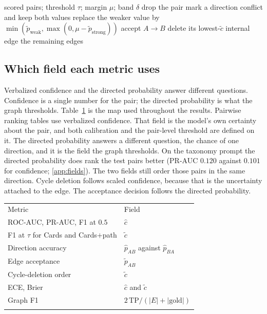 \documentclass{ws-ijait}
\newcommand{\phat}{\hat{p}}
\newcommand{\chat}{\hat{c}}
\begin{document}
\begin{algorithm}[t]
\caption{Reverse-conflict suppression and cycle breaking.}
\label{alg:c23}
\begin{algorithmic}[1]
\Require scored pairs; threshold $\tau$; margin $\mu$; band $\delta$
    \State drop the pair
    \State mark a direction conflict and keep both values
  \Else
    \State replace the weaker value by $\min(\tilde{p}_{\mathrm{weak}},\max(0,\mu-\tilde{p}_{\mathrm{strong}}))$
  \EndIf
    \State accept $A\to B$
  \EndIf
\EndFor
{}
  \State delete its lowest-$\tilde{c}$ internal edge
\EndWhile
\State \Return the remaining edges
\end{algorithmic}
\end{algorithm}

\subsection{Which field each metric uses}
\label{sec:fields}
Verbalized confidence and the directed probability answer different
questions.
Confidence is a single number for the pair; the directed probability
is what the graph thresholds.
Table~\ref{tab:fields} is the map used throughout the results.
Pairwise ranking tables use verbalized confidence.
That field is the model's own certainty about the pair, and both
calibration and the pair-level threshold are defined on it.
The directed probability answers a different question, the chance of
one direction, and it is the field the graph thresholds.
On the taxonomy prompt the directed probability does rank the test
pairs better ({PR}-{AUC} $0.120$ against $0.101$ for confidence;
\ref{app:fields}).
The two fields still order those pairs in the same direction.
Cycle deletion follows scaled confidence, because that is the
uncertainty attached to the edge.
The acceptance decision follows the directed probability.

\begin{table}[th]
{\begin{tabular}{@{}ll@{}}
\toprule
Metric & Field \\
\colrule
{ROC}-{AUC}, {PR}-{AUC}, {F1} at $0.5$ & $\chat$ \\
{F1} at $\tau$ for Cards and Cards$+$path & $\tilde{c}$ \\
Direction accuracy & $\phat_{AB}$ against $\phat_{BA}$ \\
Edge acceptance & $\tilde{p}_{AB}$ \\
Cycle-deletion order & $\tilde{c}$ \\
{ECE}, {Brier} & $\chat$ and $\tilde{c}$ \\
Graph {F1} & $2\,\mathrm{TP}/(\lvert E\rvert+\lvert\mathrm{gold}\rvert)$ \\
\botrule
\end{tabular}}
\label{tab:fields}
\end{table}
\end{document}
